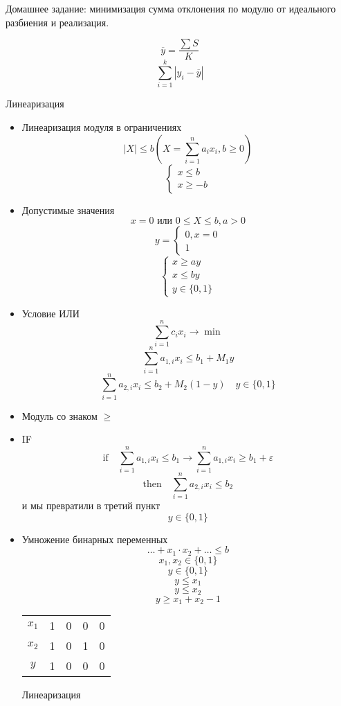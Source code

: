 \documentclass[%
10pt, %
final, %
oneside, %
onecolumn, %
centertags]{article} %
\theoremstyle{plain}
\theoremstyle{definition}
\theoremstyle{remark}
\begin{document}
Домашнее задание: минимизация сумма отклонения по модулю от идеального разбиения и реализация.

$$\overline{y} = \frac{\sum S}{K}$$
$$\sum\limits_{i=1}^k |y_i - \overline{y}|$$

Линеаризация

\begin{itemize}
	\item Линеаризация модуля в ограничениях
	$$|X| \leq b (X=\sum\limits_{i=1}^n a_ix_i, b \geq 0)$$
	$$\begin{cases}
		x \leq b \\
		x \geq -b
	\end{cases}$$
	\item Допустимые значения
	$$x = 0 \text{ или } 0 \leq X \leq b, a >0$$
	$$y = \begin{cases}
		0, x=0 \\
		1
	\end{cases}$$
	$$\begin{cases}
		x \geq ay \\
		x \leq by \\
		y \in \{0,1\}
	\end{cases}$$

	\item Условие ИЛИ
	$$\sum\limits_{i=1} ^n c_ix_i \to \min$$
	$$\sum\limits_{i=1}^n a_{1,i}x_i \leq b_1 + M_1y$$
	$$\sum\limits_{i=1}^n a_{2,i}x_i \leq b_2+ M_2(1-y) \quad y \in \{0,1\}$$  
	\item Модуль со знаком $\geq$ 
	\item IF
	$$\text{if} \quad  \sum\limits_{i=1}^n a_{1,i}x_i \leq b_1 \to  \sum\limits_{i=1}^n a_{1,i}x_i \geq b_1 + \varepsilon$$
	$$\text{then} \quad \sum\limits_{i=1}^n a_{2,i}x_i \leq b_2 $$
	и мы превратили в третий пункт
	$$y \in \{0,1\}$$
	\item Умножение бинарных переменных
	$$\ldots + x_1\cdot x_2 + \ldots \leq b$$
	$$x_1,x_2 \in \{0,1\}$$
	$$y \in \{0,1\}$$
	$$y \leq x_1$$
	$$y \leq x_2$$
	$$y \geq x_1+x_2-1$$
	\begin{table}[H]
	\begin{center}
		\begin{tabular}{c|c|c|c|c} 
		$x_1$ & 1 & 0 & 0 & 0  \\ 
		$x_2$ & 1 & 0 & 1 & 0  \\ \hline
		$y$ & 1 & 0 & 0 & 0 
		\end{tabular}

	Линеаризация
	\end{center}
\end{table}
\end{itemize}
\end{document}
